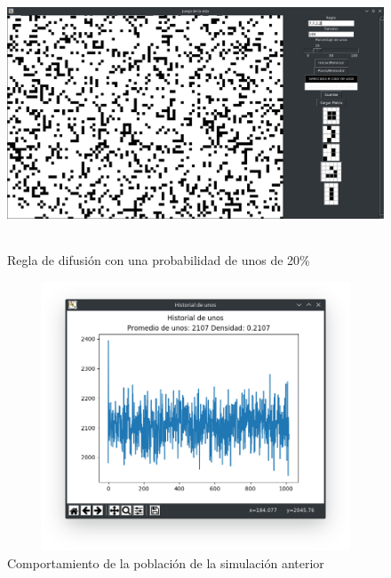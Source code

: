 \begin{figure}[H]
\begin{center}
 \includegraphics[width=12cm, height=8cm]{./img/diffusion20.png}
 \caption{Regla de difusión con una probabilidad de unos de 20\%}
 \label{fig:diffusion20}
\end{center}
\end{figure}

\begin{figure}[H]
\begin{center}
 \includegraphics[width=12cm, height=8cm]{./img/diffusion20grafica.png}
 \caption{Comportamiento de la población de la simulación anterior}
 \label{fig:diffusion20grafica}
\end{center}
\end{figure}

